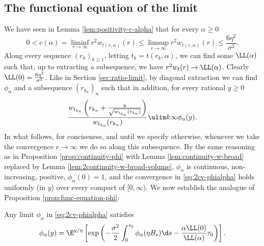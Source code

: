 \documentclass[10pt,a4paper]{article}
\begin{document}
\subsection{The functional equation of the limit}

We have seen in Lemma \ref{lem:positivity-c-alpha} that for every $\alpha\geq 0$ 
\[ 0 < c(\alpha) = \liminf_{r\to\infty} r^2 w_{t(r,\alpha)}(r) \leq \limsup_{r\to\infty} r^2 w_{t(r,\alpha)}(r) \leq \frac{6\eta^2}{\sigma^2} . \]
Along every sequence $(r_k)_{k\geq 1}$, letting $t_k = t(r_k,\alpha)$, we can find some $\LL(\alpha)$ such that, up to extracting a subsequence, we have $r^2 w_t(r) \to \LL(\alpha)$. Clearly $\LL(0) = \frac{6\eta^2}{\sigma^2}$. 
Like in Section \ref{sec:ratio-limit}, by diagonal extraction we can find $\phi_\alpha$ and a subsequence $(r_{k_n})_n$ such that in addition, for every rational $y\geq 0$
\begin{equation}\label{eq:2cv-phialpha}
\frac{w_{t_{k_n}}\left(r_{k_n} + \frac{y}{\sqrt{w_{t_{k_n}}(r_{k_n})}}\right)}{w_{t_{k_n}}(r_{k_n})} \ulim k \infty \phi_\alpha(y) .
\end{equation}
In what follows, for conciseness, and until we specify otherwise, whenever we take the convergence $r\to\infty$ we do so along this subsequence. 
By the same reasoning as in Proposition \ref{prop:continuity-phi} with Lemma \ref{lem:continuity-w-broad} replaced by Lemma \ref{lem:2continuity-w-broad-volume}, $\phi_\alpha$ is continuous, non-increasing, positive, $\phi_\alpha(0)=1$, and the convergence in \eqref{eq:2cv-phialpha} holds uniformly (in $y$) over every compact of $[0,\infty)$. We now establish the analogue of Proposition \ref{prop:func-equation-phi}:

\begin{proposition}\label{prop:2func-equation-phi-vol}
Any limit $\phi_\alpha$ in \eqref{eq:2cv-phialpha} satisfies
\begin{equation}
\phi_\alpha(y) = \E^{y/\eta}\left[\exp\left( -\frac{\sigma^2}{2} \int_0^{\tau_0} \phi_\alpha(\eta B_s) \d s - \frac{\alpha \LL(0)}{\LL(\alpha)} \tau_0 \right)\right] . 
\end{equation}
\end{proposition}
\end{document}
